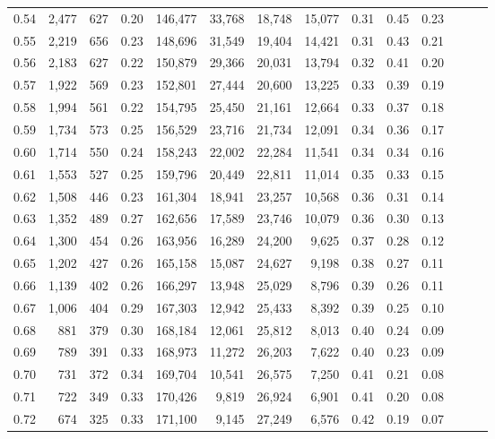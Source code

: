\begin{tabular}{rrrrrrrrrrrrrr}
0.54 &  2,477 &  627 &  0.20 &  146,477 &   33,768 &  18,748 &  15,077 &  0.31 &  0.45 &      0.23 \\
0.55 &  2,219 &  656 &  0.23 &  148,696 &   31,549 &  19,404 &  14,421 &  0.31 &  0.43 &      0.21 \\
0.56 &  2,183 &  627 &  0.22 &  150,879 &   29,366 &  20,031 &  13,794 &  0.32 &  0.41 &      0.20 \\
0.57 &  1,922 &  569 &  0.23 &  152,801 &   27,444 &  20,600 &  13,225 &  0.33 &  0.39 &      0.19 \\
0.58 &  1,994 &  561 &  0.22 &  154,795 &   25,450 &  21,161 &  12,664 &  0.33 &  0.37 &      0.18 \\
0.59 &  1,734 &  573 &  0.25 &  156,529 &   23,716 &  21,734 &  12,091 &  0.34 &  0.36 &      0.17 \\
0.60 &  1,714 &  550 &  0.24 &  158,243 &   22,002 &  22,284 &  11,541 &  0.34 &  0.34 &      0.16 \\
0.61 &  1,553 &  527 &  0.25 &  159,796 &   20,449 &  22,811 &  11,014 &  0.35 &  0.33 &      0.15 \\
0.62 &  1,508 &  446 &  0.23 &  161,304 &   18,941 &  23,257 &  10,568 &  0.36 &  0.31 &      0.14 \\
0.63 &  1,352 &  489 &  0.27 &  162,656 &   17,589 &  23,746 &  10,079 &  0.36 &  0.30 &      0.13 \\
0.64 &  1,300 &  454 &  0.26 &  163,956 &   16,289 &  24,200 &   9,625 &  0.37 &  0.28 &      0.12 \\
0.65 &  1,202 &  427 &  0.26 &  165,158 &   15,087 &  24,627 &   9,198 &  0.38 &  0.27 &      0.11 \\
0.66 &  1,139 &  402 &  0.26 &  166,297 &   13,948 &  25,029 &   8,796 &  0.39 &  0.26 &      0.11 \\
0.67 &  1,006 &  404 &  0.29 &  167,303 &   12,942 &  25,433 &   8,392 &  0.39 &  0.25 &      0.10 \\
0.68 &    881 &  379 &  0.30 &  168,184 &   12,061 &  25,812 &   8,013 &  0.40 &  0.24 &      0.09 \\
0.69 &    789 &  391 &  0.33 &  168,973 &   11,272 &  26,203 &   7,622 &  0.40 &  0.23 &      0.09 \\
0.70 &    731 &  372 &  0.34 &  169,704 &   10,541 &  26,575 &   7,250 &  0.41 &  0.21 &      0.08 \\
0.71 &    722 &  349 &  0.33 &  170,426 &    9,819 &  26,924 &   6,901 &  0.41 &  0.20 &      0.08 \\
0.72 &    674 &  325 &  0.33 &  171,100 &    9,145 &  27,249 &   6,576 &  0.42 &  0.19 &      0.07 \\

\end{tabular}
